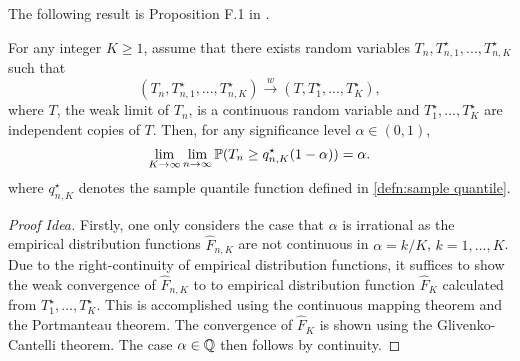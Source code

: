 The following result is Proposition F.1 in \cite{[9]}.

\begin{proposition} \label{proposition: type I error bootstrap}
    For any integer $K \geq 1$, assume that there exists random variables $T_{n}, T_{n, 1}^{\star}, ..., T_{n, K}^{\star}$ such that
    \[ (T_{n}, T_{n, 1}^{\star}, ..., T_{n, K}^{\star}) \overset{w}{\to} (T, T_1^\star, ..., T_K^\star), \]
    where $T$, the weak limit of $T_n$, is a continuous random variable and $T_1^\star, ..., T_K^\star$ are independent copies of $T$. 
    Then, for any significance level $\alpha \in (0, 1)$,
    \begin{equation}
        \lim\limits_{K \to \infty} \lim\limits_{n \to \infty} \mathbb{P}(T_n \geq q_{n, K}^\star(1-\alpha)) = \alpha.
    \end{equation}
    where $q_{n, K}^\star$ denotes the sample quantile function defined in \eqref{defn:sample quantile}.
\end{proposition}
\begin{proof}[Proof Idea]
    Firstly, one only considers the case that $\alpha$ is irrational as the empirical distribution functions $\hat{F}_{n, K}$ are not continuous in $\alpha = k/K$, $k = 1, ..., K$. Due to the right-continuity of empirical distribution functions, it suffices to show the weak convergence of $\hat{F}_{n, K}$ to to empirical distribution function $\hat{F}_{K}$ calculated from $T_1^\star, ..., T_K^\star$. This is accomplished using the continuous mapping theorem and the Portmanteau theorem. The convergence of $\hat{F}_K$ is shown using the Glivenko-Cantelli theorem. The case $\alpha \in \mathbb{Q}$ then follows by continuity.
\end{proof}
